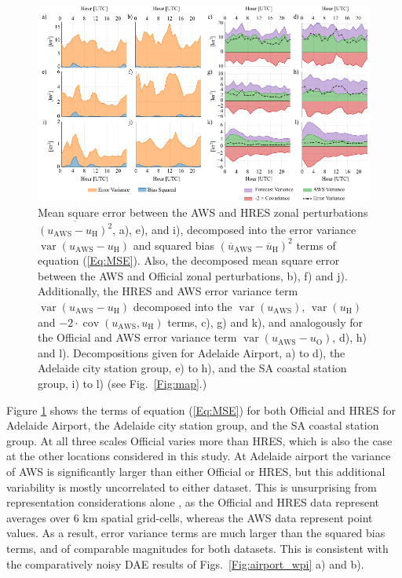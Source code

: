 \documentclass[twocol]{ametsoc}
\DeclareMathOperator{\cov}{cov}
\DeclareMathOperator{\var}{var}
\begin{document}
\begin{figure}
\centering
\includegraphics[width=39pc]{error_decomp_sa.pdf}
\caption{Mean square error between the AWS and HRES zonal perturbations $\overline{\left(u_\text{AWS} - u_\text{H}\right)^2}$, a), e), and i), decomposed into the error variance $\var\left(u_\text{AWS} - u_\text{H}\right)$ and squared bias $\left(\overline{u}_\text{AWS} - \overline{u}_\text{H}\right)^2$ terms of equation (\ref{Eq:MSE}). Also, the decomposed mean square error between the AWS and Official zonal perturbations, b), f) and j). Additionally, the HRES and AWS error variance term $\var\left(u_\text{AWS} - u_\text{H}\right)$ decomposed into the $\var\left(u_\text{AWS}\right)$, $\var\left(u_\text{H}\right)$ and  $- 2 \cdot \cov\left(u_\text{AWS}, u_\text{H}\right)$ terms, c), g) and k), and analogously for the Official and AWS error variance term $\var\left(u_\text{AWS} - u_\text{O}\right)$, d), h) and l). Decompositions given for Adelaide Airport, a) to d), the Adelaide city station group, e) to h), and the SA coastal station group, i) to l) (see Fig.~\ref{Fig:map}.)}
\label{Fig:error_decomp_sa}
\end{figure}

Figure \ref{Fig:error_decomp_sa} shows the terms of equation (\ref{Eq:MSE}) for both Official and HRES for Adelaide Airport, the Adelaide city station group, and the SA coastal station group.  At all three scales Official varies more than HRES, which is also the case at the other locations considered in this study. At Adelaide airport the variance of AWS is significantly larger than either Official or HRES, but this additional variability is mostly uncorrelated to either dataset. This is unsurprising from representation considerations alone \citep[e.g.][]{zaron06}, as the Official and HRES data represent averages over 6 km spatial grid-cells, whereas the AWS data represent point values. As a result, error variance terms are much larger than the squared bias terms, and of comparable magnitudes for both datasets. This is consistent with the comparatively noisy DAE results of Figs.~\ref{Fig:airport_wpi} a) and b). 
\end{document}
